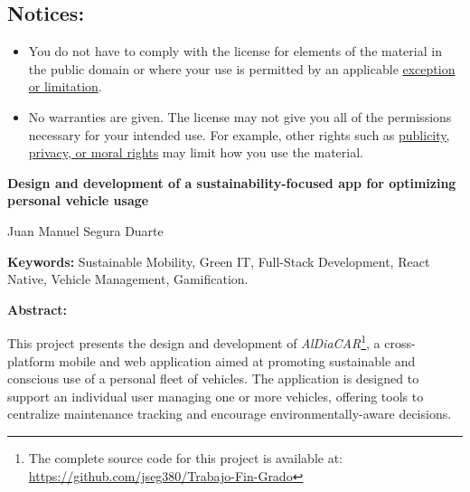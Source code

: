 \begin{tcolorbox}
\vspace{-4mm} %
\section*{\scriptsize\bfseries Notices:}
\vspace{-\baselineskip} %
\begin{itemize}[itemsep=1pt,leftmargin=18pt,partopsep=0pt]
    \item You do not have to comply with the license for elements of the material in the public domain or where your use is permitted by an applicable \href{https://creativecommons.org/licenses/by/4.0/#ref-exception-or-limitation}{exception or limitation}.
    \item No warranties are given. The license may not give you all of the permissions necessary for your intended use. For example, other rights such as \href{https://creativecommons.org/licenses/by/4.0/#ref-publicity-privacy-or-moral-rights}{publicity, privacy, or moral rights} may limit how you use the material.
\end{itemize}
\end{tcolorbox}
\restoregeometry

\newpage


\newpage


\begin{center}
    {\large\bfseries Design and development of a sustainability-focused app for optimizing personal vehicle usage}
\end{center}
\begin{center}
    Juan Manuel Segura Duarte
\end{center}

\begin{flushleft}
    \textbf{Keywords:} Sustainable Mobility, Green IT, Full-Stack Development, React Native, Vehicle Management, Gamification.
\end{flushleft}

\begin{flushleft}
    \textbf{Abstract:}
\end{flushleft}

This project presents the design and development of \textit{AlDiaCAR}\footnote{The complete source code for this project is available at: \url{https://github.com/jseg380/Trabajo-Fin-Grado}}, a cross-platform mobile and web application aimed at promoting sustainable and conscious use of a personal fleet of vehicles. The application is designed to support an individual user managing one or more vehicles, offering tools to centralize maintenance tracking and encourage environmentally-aware decisions.

